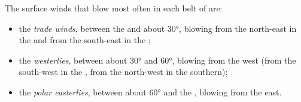 \begin{definition}\label{def:g8:winds-global-circulation:global-winds}
The surface winds that blow most often in each belt of  are:
\begin{itemize}
  \item the \emph{trade winds}, between the  and
        about \ang{30}, blowing from the north-east in the  and from the south-east in the ;
  \item the \emph{westerlies}, between about \ang{30}
        and \ang{60}, blowing from the west (from the south-west in the
        , from the north-west in the southern);
  \item the \emph{polar easterlies}, between about
        \ang{60} and the , blowing from the east.
\end{itemize}
\end{definition}

